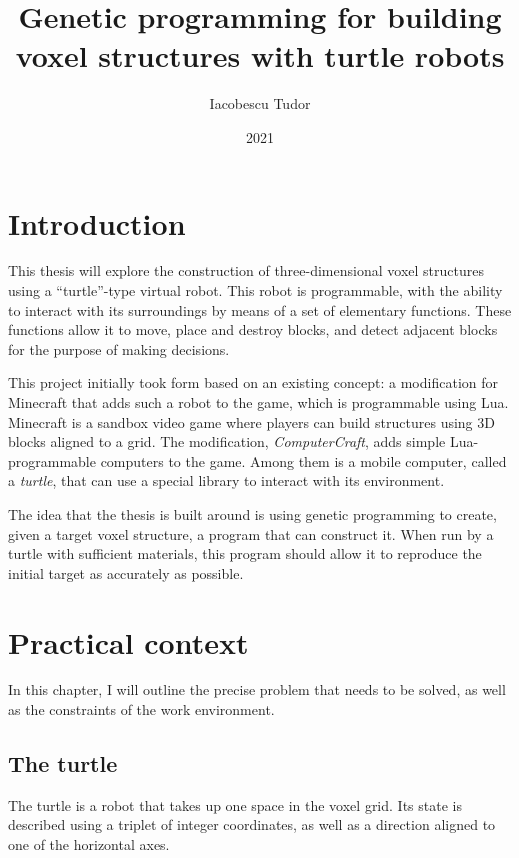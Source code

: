 \documentclass{report}
\title{Genetic programming for building voxel structures with turtle robots}
\author{Iacobescu Tudor}
\date{2021}
\begin{document}

\maketitle

\tableofcontents

\chapter{Introduction}
This thesis will explore the construction of three-dimensional voxel structures using a “turtle”-type virtual robot. This robot is programmable, with the ability to interact with its surroundings by means of a set of elementary functions. These functions allow it to move, place and destroy blocks, and detect adjacent blocks for the purpose of making decisions.

This project initially took form based on an existing concept: a modification for Minecraft that adds such a robot to the game, which is programmable using Lua. Minecraft is a sandbox video game where players can build structures using 3D blocks aligned to a grid. The modification, \emph{ComputerCraft}\cite{ccwiki}, adds simple Lua-programmable computers to the game. Among them is a mobile computer, called a \emph{turtle}, that can use a special library to interact with its environment.

The idea that the thesis is built around is using genetic programming to create, given a target voxel structure, a program that can construct it. When run by a turtle with sufficient materials, this program should allow it to reproduce the initial target as accurately as possible.

\chapter{Practical context}
In this chapter, I will outline the precise problem that needs to be solved, as well as the constraints of the work environment.

\section{The turtle}
\label{sec:turtle}

The turtle is a robot that takes up one space in the voxel grid. Its state is described using a triplet of integer coordinates, as well as a direction aligned to one of the horizontal axes.
\end{document}
